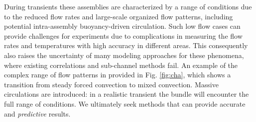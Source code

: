 During transients these assemblies are characterized by a range of conditions
due to the reduced flow rates and large-scale organized flow patterns,
including potential intra-assembly buoyancy-driven circulation. Such low flow
cases can provide challenges for experiments due to complications in measuring
the flow rates and temperatures with high accuracy in different areas. This
consequently also raises the uncertainty of many modeling approaches for these
phenomena, where existing correlations and sub-channel methods fail. An example
of the complex range of flow patterns in provided in Fig. \ref{fig:cha},
which shows a transition from steady forced convection to mixed convection.
Massive circulations are introduced: in a realistic transient the bundle will
encounter the full range of conditions. We ultimately seek methods that can
provide accurate and \textit{predictive} results.






